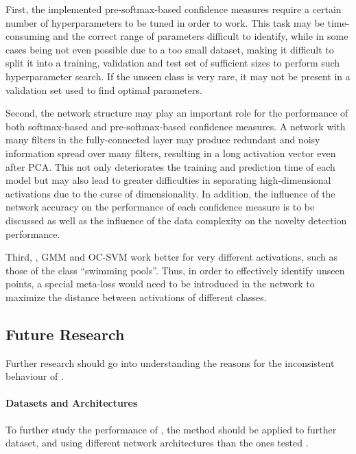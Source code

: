 \documentclass[10pt]{article}
\begin{document}
\label{subsec:limitaitons}
First, the implemented pre-softmax-based confidence measures require a certain number of hyperparameters to be tuned in order to work. This task may be time-consuming and the correct range of parameters difficult to identify, while in some cases being not even possible due to a too small dataset, making it difficult to split it into a training, validation and test set of sufficient sizes to perform such hyperparameter search. If the unseen class is very rare, it may not be present in a validation set used to find optimal parameters. 

Second, the network structure may play an important role for the performance of both softmax-based and pre-softmax-based confidence measures. A network with many filters in the fully-connected layer may produce redundant and noisy information spread over many filters, resulting in a long activation vector even after \gls{PCA}. This not only deteriorates the training and prediction time of each model but may also lead to greater difficulties in separating high-dimensional activations due to the curse of dimensionality. In addition, the influence of the network accuracy on the performance of each confidence measure is to be discussed as well as the influence of the data complexity on the novelty detection performance.

Third, , \gls{GMM} and \gls{OC-SVM} work better for very different activations, such as those of the class ``swimming pools''. Thus, in order to effectively identify unseen points, a special meta-loss would need to be introduced in the network to maximize the distance between activations of different classes.


\subsection{Future Research}
\label{subsec:future_research}

Further research should go into understanding the reasons for the inconsistent behaviour of . 

\paragraph{Datasets and Architectures} To further study the performance of , the method should be applied to further dataset, and using different network architectures than the ones tested \cite{ronneberger2015u,Berkeley2015HypercolumnsFO}.
\end{document}
